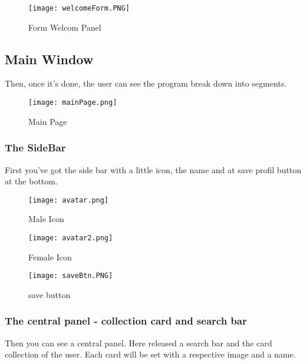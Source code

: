 \documentclass{article}
\begin{document}
\begin{figure}[htbp]
\centering
\texttt{[image: welcomeForm.PNG]}
\caption{Form Welcom Panel}
\end{figure}

\subsection{Main Window}\label{main-window}

Then, once it's done, the user can see the program break down into
segments.

\begin{figure}[htbp]
\centering
\texttt{[image: mainPage.png]}
\caption{Main Page}
\end{figure}

\subsubsection{The SideBar}\label{a---the-sidebar}

First you've got the side bar with a little icon, the name and at save profil button at the bottom.
\begin{figure}[htbp]
    \centering
    \begin{minipage}{.3\textwidth}
        \centering
        \texttt{[image: avatar.png]}
        \caption{Male Icon}
    \end{minipage}%
    \begin{minipage}{.3\textwidth}
        \centering
         \texttt{[image: avatar2.png]}
         \caption{Female Icon}
    \end{minipage}%
    \begin{minipage}{.3\textwidth}
        \centering
        \texttt{[image: saveBtn.PNG]}
        \caption{save button}
    \end{minipage}
\end{figure}

            
           
 

\subsubsection{The central panel - collection card and search
bar}\label{the-central-panel---collection-card-and-search-bar}

Then you can see a central panel. Here released a search bar and the
card collection of the user. Each card will be set with a respective
image and a name.
\end{document}
